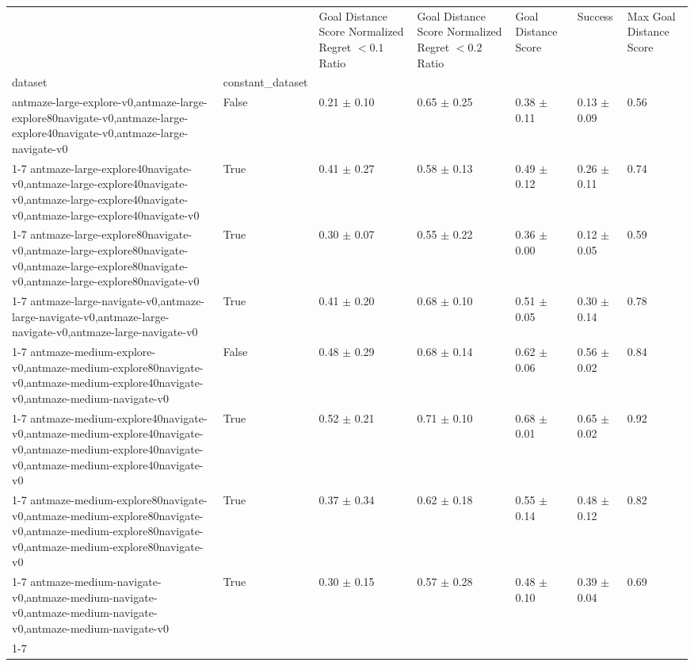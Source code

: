 \begin{tabular}{lllllll}
\toprule
 &  & Goal Distance Score Normalized Regret $< 0.1$ Ratio & Goal Distance Score Normalized Regret $< 0.2$ Ratio & Goal Distance Score & Success & Max Goal Distance Score \\
dataset & constant_dataset &  &  &  &  &  \\
\midrule
antmaze-large-explore-v0,antmaze-large-explore80navigate-v0,antmaze-large-explore40navigate-v0,antmaze-large-navigate-v0 & False & 0.21 $\pm$ 0.10 & 0.65 $\pm$ 0.25 & 0.38 $\pm$ 0.11 & 0.13 $\pm$ 0.09 & 0.56 \\
\cline{1-7}
antmaze-large-explore40navigate-v0,antmaze-large-explore40navigate-v0,antmaze-large-explore40navigate-v0,antmaze-large-explore40navigate-v0 & True & 0.41 $\pm$ 0.27 & 0.58 $\pm$ 0.13 & 0.49 $\pm$ 0.12 & 0.26 $\pm$ 0.11 & 0.74 \\
\cline{1-7}
antmaze-large-explore80navigate-v0,antmaze-large-explore80navigate-v0,antmaze-large-explore80navigate-v0,antmaze-large-explore80navigate-v0 & True & 0.30 $\pm$ 0.07 & 0.55 $\pm$ 0.22 & 0.36 $\pm$ 0.00 & 0.12 $\pm$ 0.05 & 0.59 \\
\cline{1-7}
antmaze-large-navigate-v0,antmaze-large-navigate-v0,antmaze-large-navigate-v0,antmaze-large-navigate-v0 & True & 0.41 $\pm$ 0.20 & 0.68 $\pm$ 0.10 & 0.51 $\pm$ 0.05 & 0.30 $\pm$ 0.14 & 0.78 \\
\cline{1-7}
antmaze-medium-explore-v0,antmaze-medium-explore80navigate-v0,antmaze-medium-explore40navigate-v0,antmaze-medium-navigate-v0 & False & 0.48 $\pm$ 0.29 & 0.68 $\pm$ 0.14 & 0.62 $\pm$ 0.06 & 0.56 $\pm$ 0.02 & 0.84 \\
\cline{1-7}
antmaze-medium-explore40navigate-v0,antmaze-medium-explore40navigate-v0,antmaze-medium-explore40navigate-v0,antmaze-medium-explore40navigate-v0 & True & 0.52 $\pm$ 0.21 & 0.71 $\pm$ 0.10 & 0.68 $\pm$ 0.01 & 0.65 $\pm$ 0.02 & 0.92 \\
\cline{1-7}
antmaze-medium-explore80navigate-v0,antmaze-medium-explore80navigate-v0,antmaze-medium-explore80navigate-v0,antmaze-medium-explore80navigate-v0 & True & 0.37 $\pm$ 0.34 & 0.62 $\pm$ 0.18 & 0.55 $\pm$ 0.14 & 0.48 $\pm$ 0.12 & 0.82 \\
\cline{1-7}
antmaze-medium-navigate-v0,antmaze-medium-navigate-v0,antmaze-medium-navigate-v0,antmaze-medium-navigate-v0 & True & 0.30 $\pm$ 0.15 & 0.57 $\pm$ 0.28 & 0.48 $\pm$ 0.10 & 0.39 $\pm$ 0.04 & 0.69 \\
\cline{1-7}
\bottomrule
\end{tabular}
